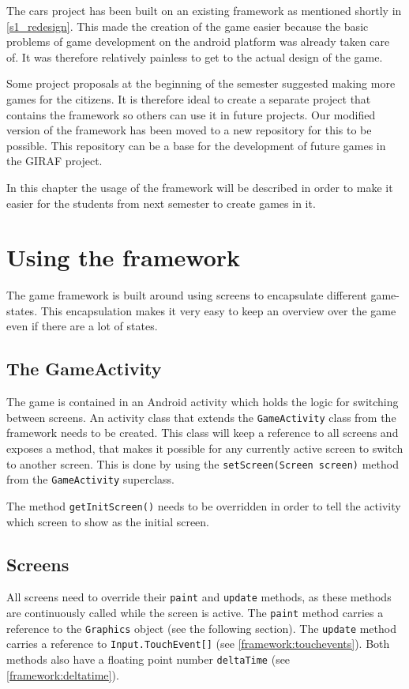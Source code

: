 \label{common_game_framework}
The cars project has been built on an existing framework as mentioned shortly in \cref{s1_redesign}. 
This made the creation of the game easier because the basic problems of game development on the android platform was already taken care of.
It was therefore relatively painless to get to the actual design of the game. 

Some project proposals at the beginning of the semester suggested making more games for the citizens.
It is therefore ideal to create a separate project that contains the framework so others can use it in future projects.
Our modified version of the framework has been moved to a new repository for this to be possible.
This repository can be a base for the development of future games in the GIRAF project.

In this chapter the usage of the framework will be described in order to make it easier for the students from next semester to create games in it.

\section{Using the framework}
The game framework is built around using screens to encapsulate different game-states. 
This encapsulation makes it very easy to keep an overview over the game even if there are a lot of states.

\subsection{The GameActivity}
The game is contained in an Android activity which holds the logic for switching between screens.
An activity class that extends the \lstinline|GameActivity| class from the framework needs to be created.
This class will keep a reference to all screens and exposes a method, that makes it possible for any currently active screen to switch to another screen.
This is done by using the \lstinline|setScreen(Screen screen)| method from the \lstinline|GameActivity| superclass.

The method \lstinline|getInitScreen()| needs to be overridden in order to tell the activity which screen to show as the initial screen.

\subsection{Screens}
All screens need to override their \lstinline|paint| and \lstinline|update| methods, as these methods are continuously called while the screen is active.
The \lstinline|paint| method carries a reference to the \lstinline|Graphics| object (see the following section).
The \lstinline|update| method carries a reference to \lstinline|Input.TouchEvent[]| (see \cref{framework:touchevents}).
Both methods also have a floating point number \lstinline|deltaTime| (see \cref{framework:deltatime}).

